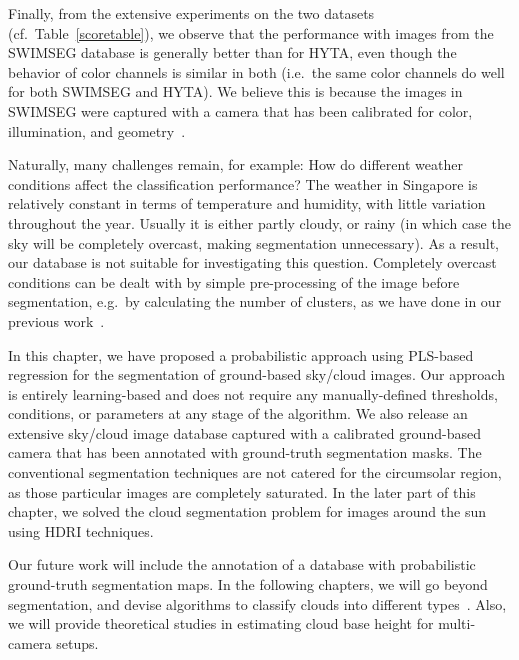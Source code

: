 Finally, from the extensive experiments on the two datasets (cf.\ Table~\ref{scoretable}), we observe that the performance with images from the SWIMSEG database is generally better than for HYTA, even though the behavior of color channels is similar in both (i.e.\ the same color channels do well for both SWIMSEG and HYTA).  We believe this is because the images in SWIMSEG were captured with a camera that has been calibrated for color, illumination, and geometry~\cite{WAHRSIS}. 

Naturally, many challenges remain, for example: How do different weather conditions affect the classification performance?  The weather in Singapore is relatively constant in terms of temperature and humidity, with little variation throughout the year.  Usually it is either partly cloudy, or rainy (in which case the sky will be completely overcast, making segmentation unnecessary). As a result, our database is not suitable for investigating this question. Completely overcast conditions can be dealt with by simple pre-processing of the image before segmentation, e.g.\ by calculating the number of clusters, as we have done in our previous work~\cite{ICIP2015a}. 


In this chapter, we have proposed a probabilistic approach using PLS-based regression for the segmentation of ground-based sky/cloud images. Our approach is entirely learning-based and does not require any manually-defined thresholds, conditions, or parameters at any stage of the algorithm. We also release an extensive sky/cloud image database captured with a calibrated ground-based camera that has been annotated with ground-truth segmentation masks. The conventional segmentation techniques are not catered for the circumsolar region, as those particular images are completely saturated. In the later part of this chapter, we solved the cloud segmentation problem for images around the sun using HDRI techniques.

Our future work will include the annotation of a database with probabilistic ground-truth segmentation maps. In the following chapters, we will go beyond segmentation, and devise algorithms to classify clouds into different types~\cite{ICIP2015a}. Also, we will provide theoretical studies in estimating cloud base height for multi-camera setups. 




